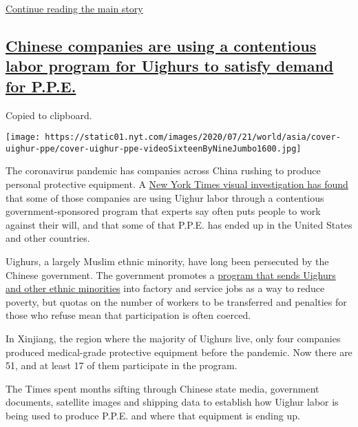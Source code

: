 \protect\hyperlink{after-dfp-ad-mid1}{Continue reading the main story}

\hypertarget{chinese-companies-are-using-a-contentious-labor-program-for-uighurs-to-satisfy-demand-for-ppe}{%
\subsection{\texorpdfstring{\protect\hyperlink{chinese-companies-are-using-a-contentious-labor-program-for-uighurs-to-satisfy-demand-for-ppe}{Chinese
companies are using a contentious labor program for Uighurs to satisfy
demand for
P.P.E.}}{Chinese companies are using a contentious labor program for Uighurs to satisfy demand for P.P.E.}}\label{chinese-companies-are-using-a-contentious-labor-program-for-uighurs-to-satisfy-demand-for-ppe}}

Copied to clipboard.

\texttt{[image: https://static01.nyt.com/images/2020/07/21/world/asia/cover-uighur-ppe/cover-uighur-ppe-videoSixteenByNineJumbo1600.jpg]}

The coronavirus pandemic has companies across China rushing to produce
personal protective equipment. A
\href{https://www.nytimes.com/2020/07/19/world/asia/china-mask-forced-labor.html}{New
York Times visual investigation has found} that some of those companies
are using Uighur labor through a contentious government-sponsored
program that experts say often puts people to work against their will,
and that some of that P.P.E. has ended up in the United States and other
countries.

Uighurs, a largely Muslim ethnic minority, have long been persecuted by
the Chinese government. The government promotes a
\href{https://www.nytimes.com/2019/12/30/world/asia/china-xinjiang-muslims-labor.html}{program
that sends Uighurs and other ethnic minorities} into factory and service
jobs as a way to reduce poverty, but quotas on the number of workers to
be transferred and penalties for those who refuse mean that
participation is often coerced.

In Xinjiang, the region where the majority of Uighurs live, only four
companies produced medical-grade protective equipment before the
pandemic. Now there are 51, and at least 17 of them participate in the
program.

The Times spent months sifting through Chinese state media, government
documents, satellite images and shipping data to establish how Uighur
labor is being used to produce P.P.E. and where that equipment is ending
up.

